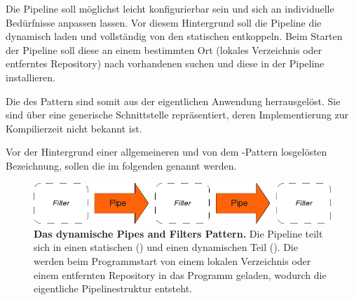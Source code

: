 Die Pipeline soll möglichst leicht konfigurierbar sein und sich an
individuelle Bedürfnisse anpassen lassen.
Vor diesem Hintergrund soll die Pipeline die  dynamisch laden und
vollständig von den statischen  entkoppeln.
Beim Starten der Pipeline soll diese an einem bestimmten Ort (lokales
Verzeichnis oder entferntes Repository) nach vorhandenen  suchen
und diese in der Pipeline installieren.

Die  des  Pattern sind somit aus der
eigentlichen Anwendung herrausgelöst. Sie sind über eine generische
Schnittstelle repräsentiert, deren Implementierung zur Kompilierzeit nicht
bekannt ist.

Vor der Hintergrund einer allgemeineren und von dem -Pattern losgelösten Bezeichnung, sollen die  im folgenden
 genannt werden.

\begin{figure}[htbp]
	\begin{center}
		\includegraphics[scale=0.7]{pics/pipesFilter21.png}
	\caption[Pipes and Filter 2]{
	\textbf{Das dynamische Pipes and Filters Pattern.}
	Die Pipeline teilt sich in einen statischen () und einen
	dynamischen Teil ().
	Die  werden beim Programmstart von einem lokalen Verzeichnis oder
	einem entfernten Repository in das Programm geladen, wodurch die eigentliche
	Pipelinestruktur entsteht.
	}
	\end{center}
	\label{fig:pipesFilter21}
\end{figure}

